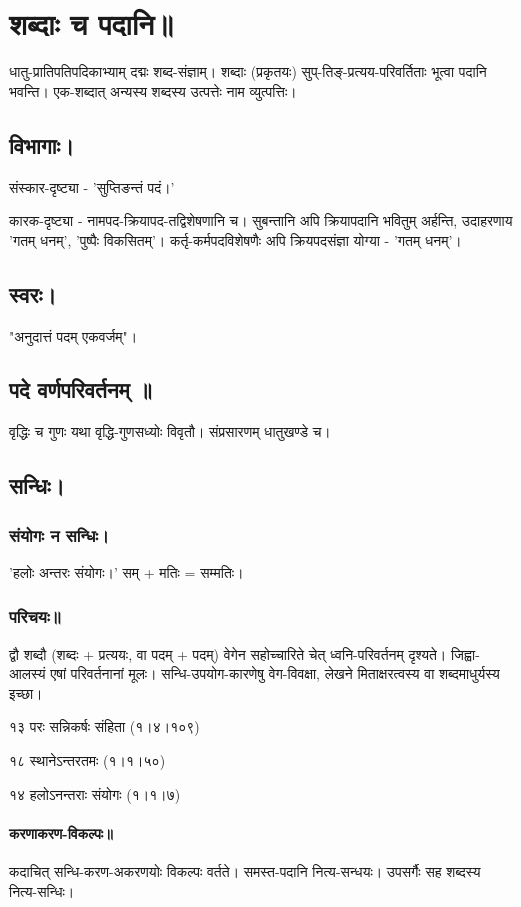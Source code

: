 \documentclass[oneside, article]{memoir}
\begin{document}
\chapter{शब्दाः च पदानि॥}
धातु-प्रातिपतिपदिकाभ्याम् दद्मः शब्द-संज्ञाम्। शब्दाः (प्रकृतयः) सुप्-तिङ्-प्रत्यय-परिवर्तिताः भूत्वा‌ पदानि भवन्ति। एक-शब्दात् अन्यस्य शब्दस्य उत्पत्तेः नाम व्युत्पत्तिः।

\section{विभागाः।}
संस्कार-दृष्ट्या - 'सुप्तिङन्तं पदं।'

कारक-दृष्ट्या - नामपद-क्रियापद-तद्विशेषणानि च। सुबन्तानि अपि क्रियापदानि भवितुम् अर्हन्ति, उदाहरणाय 'गतम् धनम्', 'पुष्पैः विकसितम्'। कर्तृ-कर्मपदविशेषणैः अपि क्रियपदसंज्ञा योग्या  - 'गतम् धनम्'।

\section{स्वरः।}
"अनुदात्तं पदम् एकवर्जम्"।

\section{पदे वर्णपरिवर्तनम् ॥}
वृद्धिः च गुणः‌ यथा वृद्धि-गुणसध्योः विवृतौ। संप्रसारणम् धातुखण्डे च।

\section{सन्धिः।}
\subsection{संयोगः न सन्धिः।}
'हलोः अन्तरः संयोगः।' सम् + मतिः = सम्मतिः।

\subsection{परिचयः॥}
द्वौ शब्दौ (शब्दः + प्रत्ययः, वा पदम् + पदम्) वेगेन सहोच्चारिते चेत् ध्वनि-परिवर्तनम् दृश्यते। जिह्वा-आलस्यं एषां परिवर्तनानां मूलः। सन्धि-उपयोग-कारणेषु वेग-विवक्षा, लेखने मिताक्षरत्वस्य वा शब्दमाधुर्यस्य इच्छा।

१३ परः सन्निकर्षः संहिता (१।४।१०९) 

१८ स्थानेऽन्तरतमः (१।१।५०)

१४ हलोऽनन्तराः संयोगः (१।१।७) 

\subsubsection{करणाकरण-विकल्पः॥}
कदाचित् सन्धि-करण-अकरणयोः विकल्पः वर्तते। समस्त-पदानि नित्य-सन्धयः। उपसर्गैः सह शब्दस्य नित्य-सन्धिः।
\end{document}
